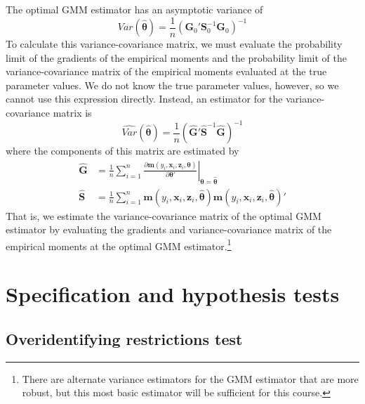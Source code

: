 \documentclass[11pt,letterpaper]{article}
\begin{document}
\noindent The optimal GMM estimator has an asymptotic variance of
$$Var(\widehat{\bm{\theta}}) = \frac{1}{n} (\bm{G}_0' \bm{S}_0^{-1} \bm{G}_0)^{-1}$$
To calculate this variance-covariance matrix, we must evaluate the probability limit of the gradients of the empirical moments and the probability limit of the variance-covariance matrix of the empirical moments evaluated at the true parameter values. We do not know the true parameter values, however, so we cannot use this expression directly. Instead, an estimator for the variance-covariance matrix is
$$\widehat{Var}(\widehat{\bm{\theta}}) = \frac{1}{n} \left( \widehat{\bm{G}}' \widehat{\bm{S}}^{-1} \widehat{\bm{G}} \right)^{-1}$$
where the components of this matrix are estimated by
\begin{align*}
	\widehat{\bm{G}} & = \frac{1}{n} \sum_{i = 1}^n \left. \frac{\partial \bm{m}(y_i, \bm{x}_i, \bm{z}_i, \bm{\theta})}{\partial \bm{\theta}'} \right\vert_{\bm{\theta} = \widehat{\bm{\theta}}} \\
	\widehat{\bm{S}} & = \frac{1}{n} \sum_{i = 1}^n \bm{m}(y_i, \bm{x}_i, \bm{z}_i, \widehat{\bm{\theta}}) \bm{m}(y_i, \bm{x}_i, \bm{z}_i, \widehat{\bm{\theta}})'
\end{align*}
That is, we estimate the variance-covariance matrix of the optimal GMM estimator by evaluating the gradients and variance-covariance matrix of the empirical moments at the optimal GMM estimator.\footnote{There are alternate variance estimators for the GMM estimator that are more robust, but this most basic estimator will be sufficient for this course.}

\section{Specification and hypothesis tests}

\subsection{Overidentifying restrictions test}
\end{document}
